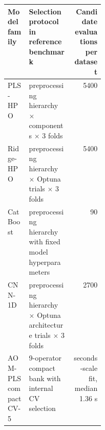 \begin{tabularx}{\linewidth}{p{0.22\linewidth}Xr}
\toprule
Model family & Selection protocol in reference benchmark & Candidate evaluations per dataset \\
\midrule
PLS-HPO & preprocessing hierarchy $\times$ components $\times$ 3 folds & 5400 \\
Ridge-HPO & preprocessing hierarchy $\times$ Optuna trials $\times$ 3 folds & 5400 \\
CatBoost & preprocessing hierarchy with fixed model hyperparameters & 90 \\
CNN-1D & preprocessing hierarchy $\times$ Optuna architecture trials $\times$ 3 folds & 2700 \\
AOM-PLS compact CV-5 & 9-operator compact bank with internal CV selection & seconds-scale fit, median 1.36 s \\
\bottomrule
\end{tabularx}
